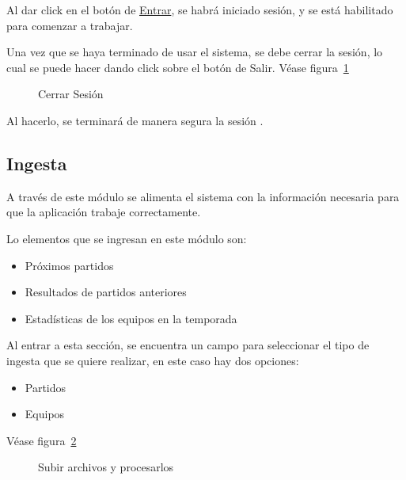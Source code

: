 Al dar click en el botón de \underline{Entrar}, se habrá iniciado sesión, y se está habilitado para comenzar a trabajar.

Una vez que se haya terminado de usar el sistema, se debe cerrar la sesión, lo cual se puede hacer dando click sobre el botón de Salir. Véase figura~\ref{Fig:Logout}

\begin{figure}[!htb]\centering
   \begin {minipage}{0.49\textwidth}
     \caption[Cerrar Sesión]{Cerrar Sesión}\label{Fig:Logout}
   \end{minipage}
\end{figure}

Al hacerlo, se terminará de manera segura la sesión .
\subsection{Ingesta}
A través de este módulo se alimenta el sistema con la información necesaria para que la aplicación trabaje correctamente.

Lo elementos que se ingresan en este módulo son:

\begin{itemize}
\item Próximos partidos
\item Resultados de partidos anteriores
\item Estadísticas de los equipos en la temporada
\end{itemize}

Al entrar a esta sección, se encuentra un campo para seleccionar el tipo de ingesta que se quiere realizar, en este caso hay dos opciones:

\begin{itemize}
\item Partidos  
\item Equipos
\end{itemize}
Véase figura~\ref{Fig:ingesta}

\begin{figure}[!htb]\centering
   \begin {minipage}{0.8\textwidth}
     \caption[Subir y procesar archivos]{Subir archivos y procesarlos\footnotemark}
	 \label{Fig:ingesta}
   \end{minipage}
\end{figure}




